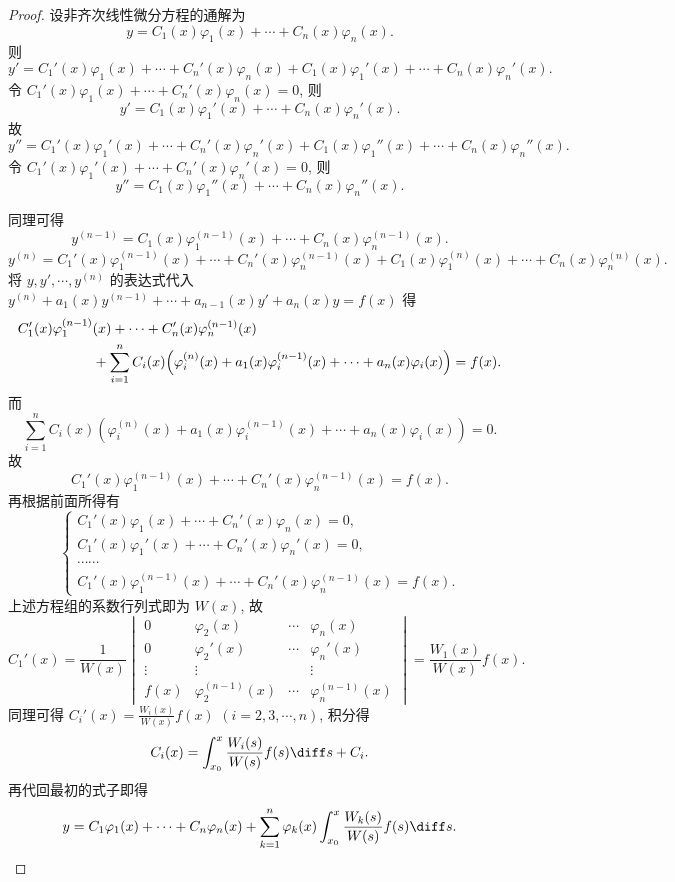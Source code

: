 \begin{proof} 
  设非齐次线性微分方程的通解为
  \[y=C_1(x)\varphi_1(x)+\cdots+C_n(x)\varphi_n(x).\]
  则
  \[y'=C_1'(x)\varphi_1(x)+\cdots+C_n'(x)\varphi_n(x)+C_1(x)\varphi_1'(x)+\cdots+C_n(x)\varphi_n'(x).\]
  令 $C_1'(x)\varphi_1(x)+\cdots+C_n'(x)\varphi_n(x)=0$, 则
  \[y'=C_1(x)\varphi_1'(x)+\cdots+C_n(x)\varphi_n'(x).\]
  故
  \[y'' = C_1'(x)\varphi_1'(x)+\cdots+C_n'(x)\varphi_n'(x)
    + C_1(x)\varphi_1''(x)+\cdots+C_n(x)\varphi_n''(x).\]
  令 $C_1'(x)\varphi_1'(x)+\cdots+C_n'(x)\varphi_n'(x)=0$, 则
  \[y''=C_1(x)\varphi_1''(x)+\cdots+C_n(x)\varphi_n''(x).\]

  同理可得
  \[y^{(n-1)} = C_1(x)\varphi_1^{(n-1)}(x)+\cdots+C_n(x)\varphi_n^{(n-1)}(x).\]
  \[y^{(n)} = C_1'(x)\varphi_1^{(n-1)}(x)
    + \cdots
    + C_n'(x)\varphi_n^{(n-1)}(x)+C_1(x)\varphi_1^{(n)}(x)+\cdots+C_n(x)\varphi_n^{(n)}(x).\]
  将 $y,y',\cdots,y^{(n)}$ 的表达式代入 $y^{(n)}+a_1(x)y^{(n-1)}+\cdots+a_{n-1}(x)y'+a_n(x)y=f(x)$ 得
  \[\begin{split}
    C_1'(x)\varphi_1^{(n-1)}&(x)+\cdots+C_n'(x)\varphi_n^{(n-1)}(x) \\
    & +\sum_{i=1}^nC_i(x)\Bigl(\varphi_i^{(n)}(x)+a_1(x)\varphi_i^{(n-1)}(x)+\cdots+a_n(x)\varphi_i(x)\Bigr)=f(x).
  \end{split}\]
  而
  \[\sum_{i=1}^nC_i(x)\left(\varphi_i^{(n)}(x)+a_1(x)\varphi_i^{(n-1)}(x)+\cdots+a_n(x)\varphi_i(x)\right)=0.\]
  故
  \[C_1'(x)\varphi_1^{(n-1)}(x)+\cdots+C_n'(x)\varphi_n^{(n-1)}(x)=f(x).\]
  再根据前面所得有
  \[\begin{cases}
    C_1'(x)\varphi_1(x)+\cdots+C_n'(x)\varphi_n(x)=0, \\
    C_1'(x)\varphi_1'(x)+\cdots+C_n'(x)\varphi_n'(x)=0, \\
    \cdots\cdots\\
    C_1'(x)\varphi_1^{(n-1)}(x)+\cdots+C_n'(x)\varphi_n^{(n-1)}(x)=f(x).
  \end{cases}\]
  上述方程组的系数行列式即为 $W(x)$, 故
  \[C_1'(x)
    = \frac{1}{W(x)}
    \begin{vmatrix}
      0&\varphi_2(x)&\cdots&\varphi_n(x)\\
      0&\varphi_2'(x)&\cdots&\varphi_n'(x)\\
      \vdots&\vdots&&\vdots\\
      f(x)&\varphi_2^{(n-1)}(x)&\cdots&\varphi_n^{(n-1)}(x)
    \end{vmatrix}=\frac{W_1(x)}{W(x)}f(x).\]
  同理可得 $\displaystyle C_i'(x)=\frac{W_i(x)}{W(x)}f(x)$ $(i=2,3,\cdots,n)$, 积分得
  \[C_i(x)=\int_{x_0}^x\frac{W_i(s)}{W(s)}f(s)\diff s+C_i.\]
  再代回最初的式子即得
  \[y = C_1\varphi_1(x)+\cdots
    + C_n\varphi_n(x)+\sum_{k=1}^n\varphi_k(x)\int_{x_0}^x\frac{W_k(s)}{W(s)}f(s)\diff s.\qedhere\]
\end{proof}



